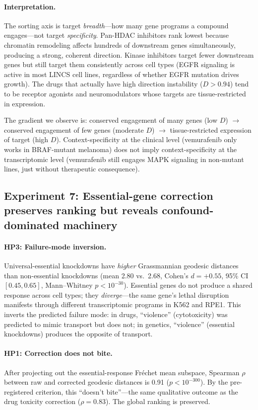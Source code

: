 \documentclass{article}
\begin{document}
\paragraph{Interpretation.}
The sorting axis is target \emph{breadth}---how many gene programs a compound
engages---not target \emph{specificity}. Pan-HDAC inhibitors rank lowest
because chromatin remodeling affects hundreds of downstream genes
simultaneously, producing a strong, coherent direction. Kinase inhibitors
target fewer downstream genes but still target them consistently across cell
types (EGFR signaling is active in most LINCS cell lines, regardless of
whether EGFR mutation drives growth). The drugs that actually have high
direction instability ($D > 0.94$) tend to be receptor agonists and
neuromodulators whose targets are tissue-restricted in expression.

The gradient we observe is: conserved engagement of many genes (low $D$)
$\to$ conserved engagement of few genes (moderate $D$) $\to$ tissue-restricted
expression of target (high $D$). Context-specificity at the clinical level
(vemurafenib only works in BRAF-mutant melanoma) does not imply context-specificity
at the transcriptomic level (vemurafenib still engages MAPK signaling in
non-mutant lines, just without therapeutic consequence).

\subsection{Experiment 7: Essential-gene correction preserves ranking but reveals confound-dominated machinery}

\paragraph{HP3: Failure-mode inversion.}
Universal-essential knockdowns have \emph{higher} Grassmannian geodesic
distances than non-essential knockdowns (mean 2.80 vs.\ 2.68, Cohen's $d =
+0.55$, 95\% CI $[0.45, 0.65]$, Mann--Whitney $p < 10^{-30}$). Essential
genes do not produce a shared response across cell types; they
\emph{diverge}---the same gene's lethal disruption manifests through
different transcriptomic programs in K562 and RPE1. This inverts the
predicted failure mode: in drugs, ``violence'' (cytotoxicity) was predicted
to mimic transport but does not; in genetics, ``violence'' (essential
knockdowns) produces the opposite of transport.

\paragraph{HP1: Correction does not bite.}
After projecting out the essential-response Fr\'echet mean subspace,
Spearman $\rho$ between raw and corrected geodesic distances is 0.91 ($p <
10^{-300}$). By the pre-registered criterion, this ``doesn't bite''---the
same qualitative outcome as the drug toxicity correction ($\rho = 0.83$).
The global ranking is preserved.
\end{document}
